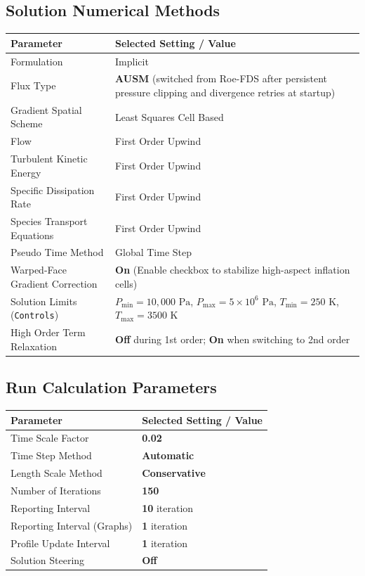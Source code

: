 \documentclass[11pt,a4paper]{article}
\begin{document}
\subsection{Solution Numerical Methods}
\begin{tabularx}{\textwidth}{L{4.5cm} Y}
\toprule
\textbf{Parameter} & \textbf{Selected Setting / Value} \\
\midrule
Formulation & Implicit \\
Flux Type & \textbf{AUSM} (switched from Roe-FDS after persistent pressure clipping and divergence retries at startup) \\
Gradient Spatial Scheme & Least Squares Cell Based \\
Flow & First Order Upwind \\
Turbulent Kinetic Energy & First Order Upwind \\
Specific Dissipation Rate & First Order Upwind \\
Species Transport Equations & First Order Upwind \\
Pseudo Time Method & Global Time Step \\
Warped-Face Gradient Correction & \textbf{On} (Enable checkbox to stabilize high-aspect inflation cells) \\
Solution Limits (\texttt{Controls}) & $P_\text{min} = 10{,}000\text{ Pa}$, $P_\text{max} = 5\times 10^6\text{ Pa}$, $T_\text{min} = 250\text{ K}$, $T_\text{max} = 3500\text{ K}$ \\
High Order Term Relaxation & \textbf{Off} during 1st order; \textbf{On} when switching to 2nd order \\
\bottomrule
\end{tabularx}

\subsection{Run Calculation Parameters}
\begin{tabularx}{\textwidth}{L{4.5cm} Y}
\toprule
\textbf{Parameter} & \textbf{Selected Setting / Value} \\
\midrule
Time Scale Factor & \textbf{0.02} \\
Time Step Method & \textbf{Automatic} \\
Length Scale Method & \textbf{Conservative} \\
Number of Iterations & \textbf{150} \\
Reporting Interval & \textbf{10} iteration \\
Reporting Interval (Graphs) & \textbf{1} iteration \\
Profile Update Interval & \textbf{1} iteration \\
Solution Steering & \textbf{Off} \\
\bottomrule
\end{tabularx}
\end{document}
